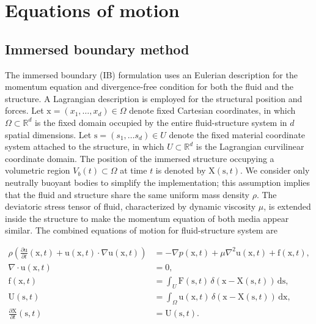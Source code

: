 \documentclass[review]{elsarticle}
\newcommand \D [2]{\frac{\partial #1}{\partial #2}}
\renewcommand{\vec}[1]{\bm{\mathrm{#1}}}
\def \div{\nabla \cdot \mbox{}}
\def \grad{\nabla}
\def \lap{\nabla^2}
\def \x{\vec{x}}
\def \u{\vec{u}}
\def \F{\vec{F}}
\def \U{\vec{U}}
\def \Vbt{V_b(t)}
\def \F{\vec{F}}
\def \U{\vec{U}}
\def \X{\vec{X}}
\def \f{\vec{f}}
\def \s{\vec{s}}
\def \u{\vec{u}}
\def \x{\vec{x}}
\def \div{\nabla \cdot \mbox{}}
\def \grad{\nabla}
\def \lap{\nabla^2}
\def \Ds{{\mathrm d}\s}
\def \Dx{{\mathrm d}\x}
\begin{document}
\section{Equations of motion}

\subsection{Immersed boundary method}
The immersed boundary (IB) formulation uses an Eulerian description for the 
momentum equation and divergence-free condition for both 
the fluid and the structure. A Lagrangian description is employed for the structural 
position and forces. Let $\x = (x_1, \ldots, x_d) \in \Omega$ denote fixed 
Cartesian coordinates, in which $\Omega \subset \mathbb{R}^d$ is the fixed 
domain occupied by the entire fluid-structure system in $d$ spatial dimensions.
Let $\s = (s_1, \ldots s_d) \in U$ denote the fixed material coordinate system 
attached to the structure, in which $U \subset \mathbb{R}^d$ is the Lagrangian curvilinear 
coordinate domain. The position of the immersed structure occupying a volumetric 
region $\Vbt \subset \Omega$ at time $t$ is denoted by $\X (\s,t)$. We consider 
only neutrally buoyant bodies to simplify the implementation; this assumption implies 
that the fluid and structure share the same uniform mass density $\rho$. The deviatoric 
stress tensor of fluid, characterized by dynamic viscosity $\mu$, is extended inside 
the structure to make the momentum equation of both media appear similar. 
The combined equations of motion for fluid-structure system are~\cite{Peskin02}

\begin{align}
\rho\left(\D{\u}{t}(\x,t) + \u(\x,t) \cdot \grad \u(\x,t) \right) &= -\grad p(\x,t) + \mu \lap \u(\x,t) + \f(\x,t), \label{eqn_momentum}\\
  \div \u(\x,t) &= 0, \label{eqn_continuity} \\
\f(\x,t)  &= \int_{U} \F(\s,t) \, \delta(\x - \X(\s,t)) \, \Ds, \label{eqn_F_f} \\
  \U(\s,t) &= \int_{\Omega} \u(\x,t) \, \delta(\x - \X(\s,t)) \, \Dx, \label{eqn_u_interpolation} \\
   \D{\X}{t} (\s,t) &= \U(\s,t). \label{eqn_body_motion} 
\end{align}
\end{document}
